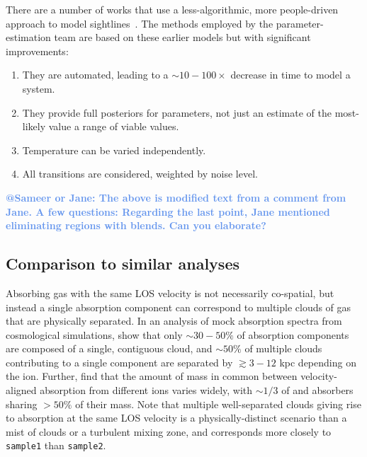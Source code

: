 \documentclass[fleqn,usenatbib]{mnras}
\makeatletter
\newcommand{\atsameer}[1]{\textcolor{CornflowerBlue}{\textbf{@Sameer or Jane: #1}}}
\makeatother
\begin{document}
There are a number of works that use a less-algorithmic, more people-driven approach to model sightlines~\citep[e.g.][]{churchill1999multiple,charlton2000anticipating,ding2003quadruple,charlton2003high,ding2003multiphase,zonak2004absorption,ding2005absorption,masiero2005models,lynch2007physical,misawa2008supersolar,lacki2010z,jones2010bare,muzahid2015extreme,richter2018,rosenwasser2018understanding, norris2021Discovery}.
The methods employed by the parameter-estimation team are based on these earlier models but with significant improvements:
\begin{enumerate}
    \item They are automated, leading to a $\sim 10-100 \times$ decrease in time to model a system.
    \item They provide full posteriors for parameters, not just an estimate of the most-likely value a range of viable values.
    \item Temperature can be varied independently.
    \item All transitions are considered, weighted by noise level.
\end{enumerate}
\atsameer{The above is modified text from a comment from Jane. A few questions:
Regarding the last point, Jane mentioned eliminating regions with blends. Can you elaborate?}

\subsection{Comparison to similar analyses}

Absorbing gas with the same LOS velocity is not necessarily co-spatial, but instead a single absorption component can correspond to multiple clouds of gas that are physically separated.
In an analysis of mock absorption spectra from cosmological simulations, \cite{Marra2022} show that only $\sim 30-50\%$ of absorption components are composed of a single, contiguous cloud, and $\sim 50\%$ of multiple clouds contributing to a single component are separated by $\gtrsim 3-12$ kpc depending on the ion.
Further, \cite{Marra2022} find that the amount of mass in common between velocity-aligned absorption from different ions varies widely, with $\sim 1/3$ of  and  absorbers sharing $>50\%$ of their mass.
Note that multiple well-separated clouds giving rise to absorption at the same LOS velocity is a physically-distinct scenario than a mist of clouds or a turbulent mixing zone, and corresponds more closely to \texttt{sample1} than \texttt{sample2}.
\end{document}
